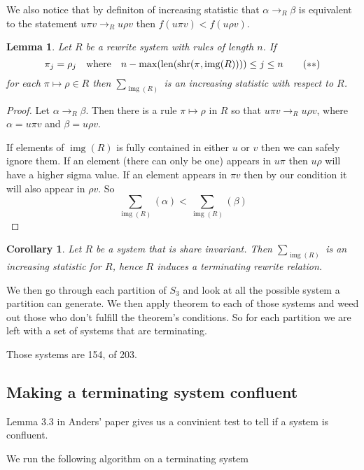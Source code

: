 \documentclass[openany, a4paper, 11pt, english]{article}
\newcommand{\patternrule}{ \mapsto \!}
\newtheorem{lemma}[theorem]{Lemma}
\newtheorem{corollary}[theorem]{Corollary}
\theoremstyle{definition}
\newcommand{\Sym}{S}
\DeclareMathOperator{\img}{img}
\DeclareMathOperator{\len}{len}
\DeclareMathOperator{\shr}{shr}
\begin{document}
We also notice that by definiton of increasing statistic that
$\alpha \to_R \beta$ is equivalent to the statement $u \pi v \to_R u \rho v$
then $f(u \pi v) < f(u \rho v)$.

\begin{lemma}
    Let $R$ be a rewrite system with rules of length $n$. If
    \[
        \pi_j = \rho_j \quad \textnormal{where} \quad 
        n-\max(\len(\shr(\pi, \img(R)))) \leq j \leq n \tag{$\ast\ast$} \label{joininvariance}
    \]
    for each $\pi \patternrule \rho \in R$ then $\sum_{\img(R)}$ is an
    increasing statistic with respect to $R$. 
\end{lemma}
\begin{proof}
    Let $\alpha \to_R \beta$. Then there is a rule $\pi \patternrule \rho$ in
    $R$ so that $u \pi v \to_R u \rho v$, where $\alpha = u \pi v$ and $\beta =
    u \rho v$. 

    If elements of $\img(R)$ is fully contained in either $u$ or $v$ then we
    can safely ignore them. If an element (there can only be one) appears in $u\pi$ then
    $u \rho$ will have a higher sigma value. If an element appears in $\pi v$
    then by our condition it will also appear in $\rho v$.
    So
    \[
        \sum_{\img(R)}(\alpha) < \sum_{\img(R)}(\beta)
    \]
\end{proof}

\begin{corollary}
    Let $R$ be a system that is share invariant. Then $\sum_{\img(R)}$ is an
    increasing statistic for $R$, hence $R$ induces a terminating rewrite relation.
\end{corollary}

We then go through each partition of $\Sym_3$ and look at all the possible
system a partition can generate. We then apply theorem to each of those systems
and weed out those who don't fulfill the theorem's conditions. So for each
partition we are left with a set of systems that are terminating.

Those systems are 154, of 203.

\subsection{Making a terminating system confluent}
Lemma $3.3$ in Anders' paper gives us a convinient test to tell if a system is
confluent. 

We run the following algorithm on a terminating system
\end{document}
